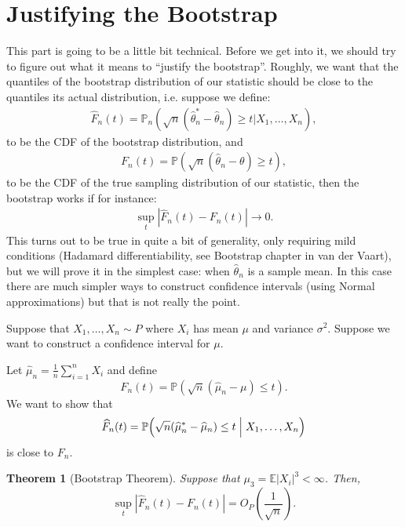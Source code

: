 \documentclass[twoside,12pt]{article}
\newcounter{lecnum}
\newtheorem{theorem}{Theorem}[lecnum]
\begin{document}
\section{Justifying the Bootstrap}
This part is going to be a little bit technical. Before we get into it, we should try to figure out what it means to ``justify the bootstrap''. Roughly, we want that the quantiles of the bootstrap distribution of our statistic should be close to the quantiles its actual distribution, i.e. suppose we define:
\begin{align*}
\widehat{F}_n(t) = \mathbb{P}_n(\sqrt{n} (\widehat{\theta}_n^* - \widehat{\theta}_n) \geq t \vert X_1,\ldots,X_n),
\end{align*}
to be the CDF of the bootstrap distribution, and
\begin{align*}
F_n(t) = \mathbb{P}(\sqrt{n} (\widehat{\theta}_n - \theta) \geq t),
\end{align*}
to be the CDF of the true sampling distribution of our statistic, then the bootstrap works if for instance:
\begin{align*}
\sup_{t} |\widehat{F}_n(t) - F_n(t)| \rightarrow 0.
\end{align*}
This turns out to be true in quite a bit of generality, only requiring mild conditions (Hadamard differentiability, see Bootstrap chapter in van der Vaart), but we will prove it in the simplest case: when $\widehat{\theta}_n$ is a sample mean. In this case there are much simpler ways to construct confidence intervals (using Normal approximations) but that is not really the point.

Suppose that
$X_1,\ldots, X_n \sim P$
where $X_i$ has mean $\mu$
and variance $\sigma^2$.
Suppose we want to construct a confidence interval for $\mu$.

Let $\widehat\mu_n = \frac{1}{n}\sum_{i=1}^n X_i$ and define
\begin{equation}
F_n(t) = \mathbb{P}( \sqrt{n}(\widehat\mu_n - \mu) \leq t).
\end{equation}
We want to show that
$$
\widehat F_n(t) = \mathbb{P}\Bigl( \sqrt{n}(\widehat\mu_n^* - \widehat\mu_n) \leq t \Bigm| X_1,\ldots, X_n\Bigr)
$$
is close to $F_n$.



\begin{theorem}[Bootstrap Theorem]
Suppose that $\mu_3 = \mathbb{E}|X_i|^3 < \infty$.
Then,
$$
\sup_t | \widehat F_n(t) - F_n(t)| = O_P\left(\frac{1}{\sqrt{n}}\right).
$$
\end{theorem}
\end{document}
